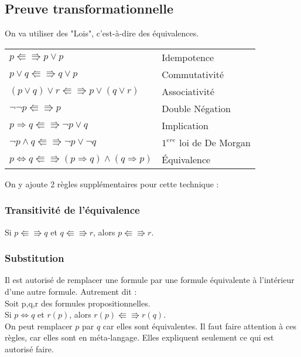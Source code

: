 		\subsection{Preuve transformationnelle}
			On va utiliser des "Lois", c'est-à-dire des équivalences.
			\begin{center}
			\begin{tabular}{|ll|}
			\hline
			$p \Lleftarrow \Rrightarrow p \lor p$ & Idempotence\\
			$p \lor q \Lleftarrow \Rrightarrow q \lor p$ & Commutativité\\
			$(p \lor q) \lor r \Lleftarrow \Rrightarrow p \lor (q \lor r)$ & Associativité\\
			$ \lnot \lnot p \Lleftarrow \Rrightarrow p$ & Double Négation\\
			$p \Rightarrow q \Lleftarrow \Rrightarrow \lnot p \lor q$ & Implication\\
			$\lnot p \land q \Lleftarrow \Rrightarrow \lnot p \lor \lnot q$ & $1^{ere}$ loi de De Morgan\\
			$p \Leftrightarrow q \Lleftarrow \Rrightarrow (p \Rightarrow q) \land (q \Rightarrow p)$ & Équivalence\\
			\hline
			\end{tabular}
			\end{center}
			On y ajoute 2 règles supplémentaires pour cette technique : 
			\subsubsection*{Transitivité de l'équivalence}
			\indent Si $p \Lleftarrow \Rrightarrow q$ et $q \Lleftarrow \Rrightarrow r$, alors $p \Lleftarrow \Rrightarrow r$.
			\subsubsection*{Substitution}
			Il est autorisé de remplacer une formule par une formule équivalente à l’intérieur d’une autre formule. Autrement dit : \\
			\indent Soit p,q,r des formules propositionnelles.\\
			\indent Si $p \Leftrightarrow q$ et $r(p)$, alors $r(p) \Lleftarrow \Rrightarrow r(q)$.\\
			On peut remplacer $p$ par $q$ car elles sont équivalentes. Il faut faire attention à ces règles, car elles sont en méta-langage. Elles expliquent seulement ce qui est autorisé  faire.
			

